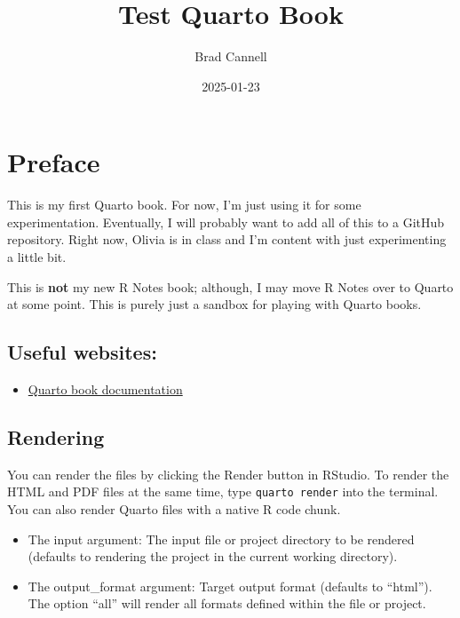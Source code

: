 \documentclass[
  letterpaper,
  DIV=11,
  numbers=noendperiod]{scrreprt}
\title{Test Quarto Book}
\author{Brad Cannell}
\date{2025-01-23}
\providecommand{\tightlist}{%
  \setlength{\itemsep}{0pt}\setlength{\parskip}{0pt}}\usepackage{longtable,booktabs,array}
\renewcommand*\contentsname{Table of contents}
\newcommand\contentsname{Table of contents}
\begin{document}
\maketitle

\renewcommand*\contentsname{Table of contents}
{
\hypersetup{linkcolor=}
\setcounter{tocdepth}{2}
\tableofcontents
}

\chapter*{Preface}\label{preface}


This is my first Quarto book. For now, I'm just using it for some
experimentation. Eventually, I will probably want to add all of this to
a GitHub repository. Right now, Olivia is in class and I'm content with
just experimenting a little bit.

This is \textbf{not} my new R Notes book; although, I may move R Notes
over to Quarto at some point. This is purely just a sandbox for playing
with Quarto books.

\section*{Useful websites:}\label{useful-websites}


\begin{itemize}
\tightlist
\item
  \href{https://quarto.org/docs/books/}{Quarto book documentation}
\end{itemize}

\section*{Rendering}\label{rendering}


You can render the files by clicking the Render button in RStudio. To
render the HTML and PDF files at the same time, type
\texttt{quarto\ render} into the terminal. You can also render Quarto
files with a native R code chunk.

\begin{itemize}
\item
  The input argument: The input file or project directory to be rendered
  (defaults to rendering the project in the current working directory).
\item
  The output\_format argument: Target output format (defaults to
  ``html''). The option ``all'' will render all formats defined within
  the file or project.
\end{itemize}
\end{document}
